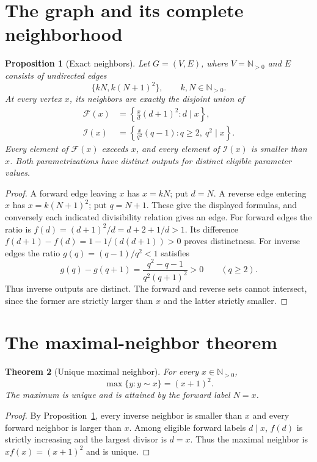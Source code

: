\documentclass[11pt,a4paper]{article}
\newtheorem{theorem}{Theorem}[section]
\newtheorem{proposition}[theorem]{Proposition}
\newcommand{\NN}{\mathbb N_{>0}}
\begin{document}
\section{The graph and its complete neighborhood}
\begin{proposition}[Exact neighbors]\label{prop:neighbors}
Let $G=(V,E)$, where $V=\NN$ and $E$ consists of undirected edges
\[
 \{kN,k(N+1)^2\}, \qquad k,N\in\NN.
\]
At every vertex $x$, its neighbors are exactly the disjoint union of
\begin{align}
 \mathcal F(x)&=\left\{\frac{x}{d}(d+1)^2: d\mid x\right\},\\
 \mathcal I(x)&=\left\{\frac{x}{q^2}(q-1): q\ge2,\ q^2\mid x\right\}.
\end{align}
Every element of $\mathcal F(x)$ exceeds $x$, and every element of $\mathcal I(x)$ is smaller than $x$. Both parametrizations have distinct outputs for distinct eligible parameter values.
\end{proposition}
\begin{proof}
A forward edge leaving $x$ has $x=kN$; put $d=N$. A reverse edge entering $x$ has $x=k(N+1)^2$; put $q=N+1$. These give the displayed formulas, and conversely each indicated divisibility relation gives an edge. For forward edges the ratio is
$ f(d)=(d+1)^2/d=d+2+1/d>1$. Its difference $f(d+1)-f(d)=1-1/(d(d+1))>0$ proves distinctness. For inverse edges the ratio $g(q)=(q-1)/q^2<1$ satisfies
\[
 g(q)-g(q+1)=\frac{q^2-q-1}{q^2(q+1)^2}>0\qquad(q\ge2).
\]
Thus inverse outputs are distinct. The forward and reverse sets cannot intersect, since the former are strictly larger than $x$ and the latter strictly smaller.
\end{proof}

\section{The maximal-neighbor theorem}
\begin{theorem}[Unique maximal neighbor]\label{thm:max}
For every $x\in\NN$,
\[
\boxed{\max\{y:y\sim x\}=(x+1)^2.}
\]
The maximum is unique and is attained by the forward label $N=x$.
\end{theorem}
\begin{proof}
By Proposition~\ref{prop:neighbors}, every inverse neighbor is smaller than $x$ and every forward neighbor is larger than $x$. Among eligible forward labels $d\mid x$, $f(d)$ is strictly increasing and the largest divisor is $d=x$. Thus the maximal neighbor is $x f(x)=(x+1)^2$ and is unique.
\end{proof}
\end{document}

